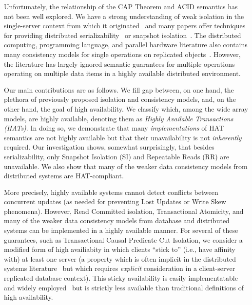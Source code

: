 Unfortunately, the relationship of the CAP Theorem and ACID semantics
has not been well explored. We have a strong understanding of weak
isolation in the single-server context from which it
originated~\cite{adya, ansicritique, gray-isolation} and many papers
offer techniques for providing distributed
serializability~\cite{bernstein-concurrency, spanner, granola,
  daudjee-session, krikellas-bargain, calvin} or snapshot
isolation~\cite{daudjee-snapshot,generalizedsnapshot, kemme-snapshot,
  walter}. The distributed computing, programming language, and
parallel hardware literature also contains many consistency models for
single operations on replicated objects~\cite{pnuts, herlihy-art,
  cops, eiger, cac, sessionguarantees}. However, the literature has
largely ignored semantic guarantees for multiple operations operating
on multiple data items in a highly available distributed environment.

Our main contributions are as follows. We fill gap between, on one
hand, the plethora of previously proposed isolation and consistency
models, and, on the other hand, the goal of high availability.  We
classify which, among the wide array models, are highly available,
denoting them as {\em Highly Available Transactions (HATs)}. In doing
so, we demonstrate that many \textit{implementations} of HAT semantics
are not highly available but that their unavailability is not
\textit{inherently} required. Our investigation shows, somewhat
surprisingly, that besides serializability, only Snapshot Isolation
(SI) and Repeatable Reads (RR) are unavailable. We also show that many
of the weaker data consistency models from distributed systems are
HAT-compliant.

More precisely, highly available systems cannot detect conflicts
between concurrent updates (as needed for preventing Lost Updates or
Write Skew phenomena). However, Read Committed isolation,
Transactional Atomicity, and many of the weaker data consistency
models from database and distributed systems can be implemented in a
highly available manner. For several of these guarantees, such as
Transactional Causal Predicate Cut Isolation, we consider a modified
form of high availiabity in which clients ``stick to'' (i.e., have
affinity with) at least one server (a property which is often implicit
in the distributed systems literature~\cite{herlihy-art, cops, eiger,
  cac} but which requires \textit{explicit} consideration in a
client-server replicated database context). This sticky availability
is easily implementatable and widely employed~\cite{cops, eiger,
  vogels-defs} but is strictly less available than traditional
definitions of high availability.

